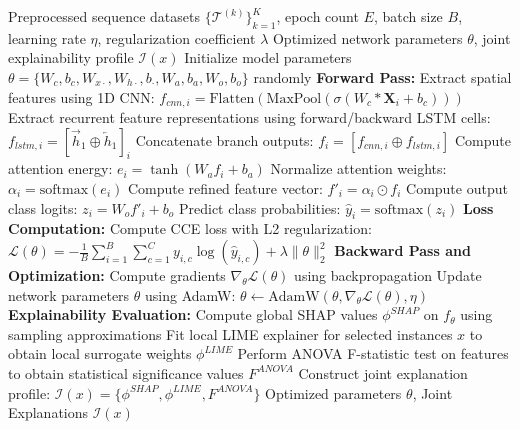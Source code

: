 \documentclass[a4paper,fleqn]{cas-sc}
\begin{document}
\begin{algorithm}
\caption{End-to-End Training and Explainable Verification of the Hybrid Framework}
\label{alg:training}
\begin{algorithmic}[1]
\REQUIRE Preprocessed sequence datasets $\{\mathcal{T}^{(k)}\}_{k=1}^{K}$, epoch count $E$, batch size $B$, learning rate $\eta$, regularization coefficient $\lambda$
\ENSURE Optimized network parameters $\theta$, joint explainability profile $\mathcal{I}(x)$
\STATE Initialize model parameters $\theta = \{W_c, b_c, W_{x\cdot}, W_{h\cdot}, b_{\cdot}, W_a, b_a, W_o, b_o\}$ randomly
        \STATE \textbf{Forward Pass:}
            \STATE Extract spatial features using 1D CNN: $f_{cnn, i} = \text{Flatten}(\text{MaxPool}(\sigma(W_c * \mathbf{X}_i + b_c)))$
            \STATE Extract recurrent feature representations using forward/backward LSTM cells: $f_{lstm, i} = [\overrightarrow{h}_1 \oplus \overleftarrow{h}_1]_i$
            \STATE Concatenate branch outputs: $f_i = [f_{cnn, i} \oplus f_{lstm, i}]$
            \STATE Compute attention energy: $e_i = \tanh(W_a f_i + b_a)$
            \STATE Normalize attention weights: $\alpha_i = \text{softmax}(e_i)$
            \STATE Compute refined feature vector: $f'_i = \alpha_i \odot f_i$
            \STATE Compute output class logits: $z_i = W_o f'_i + b_o$
            \STATE Predict class probabilities: $\hat{y}_i = \text{softmax}(z_i)$
        \ENDFOR
        \STATE \textbf{Loss Computation:}
        \STATE Compute CCE loss with L2 regularization: $\mathcal{L}(\theta) = - \frac{1}{B} \sum_{i=1}^B \sum_{c=1}^C y_{i,c} \log(\hat{y}_{i,c}) + \lambda \|\theta\|_2^2$
        \STATE \textbf{Backward Pass and Optimization:}
        \STATE Compute gradients $\nabla_\theta \mathcal{L}(\theta)$ using backpropagation
        \STATE Update network parameters $\theta$ using AdamW: $\theta \leftarrow \text{AdamW}(\theta, \nabla_\theta \mathcal{L}(\theta), \eta)$
    \ENDFOR
\ENDFOR
\STATE \textbf{Explainability Evaluation:}
\STATE Compute global SHAP values $\phi^{SHAP}$ on $f_\theta$ using sampling approximations
\STATE Fit local LIME explainer for selected instances $x$ to obtain local surrogate weights $\phi^{LIME}$
\STATE Perform ANOVA F-statistic test on features to obtain statistical significance values $F^{ANOVA}$
\STATE Construct joint explanation profile: $\mathcal{I}(x) = \{\phi^{SHAP}, \phi^{LIME}, F^{ANOVA}\}$
\RETURN Optimized parameters $\theta$, Joint Explanations $\mathcal{I}(x)$
\end{algorithmic}
\end{algorithm}
\end{document}
